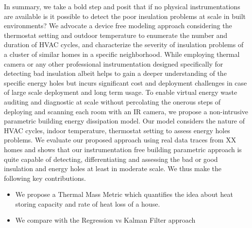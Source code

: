 \documentclass{sig-alternate}
\begin{document}
In summary, we take a bold step and posit that if no physical instrumentations are available is it possible to detect the poor insulation problems at scale in built environments? We advocate a device free modeling approach considering the thermostat setting and outdoor temperature to enumerate the number and duration of HVAC cycles, and characterize the severity of insulation problems of a cluster of similar homes in a specific neighborhood. While employing thermal camera or any other professional instrumentation designed specifically for detecting bad insulation albeit helps to gain a deeper understanding of the specific energy holes but incurs significant cost and deployment challenges in case of large scale deployment and long term usage. To enable virtual energy waste auditing and diagnostic at scale without percolating the onerous steps of deploying and scanning each room with an IR camera, we propose a non-intrusive parametric building energy dissipation model. Our model considers the nature of HVAC cycles, indoor temperature, thermostat setting to assess energy holes problems. We evaluate our proposed approach using real data traces from XX homes and shows that our instrumentation free building parametric approach is quite capable of detecting, differentiating and assessing the bad or good insulation and energy holes at least in moderate scale.
 We thus make the following key contributions.
\begin{itemize}
\item We propose a Thermal Mass Metric which quantifies the idea about heat storing capacity and rate of heat loss of a house.
\item We compare with the Regression vs Kalman Filter approach
\end{itemize}
%
\end{document}
